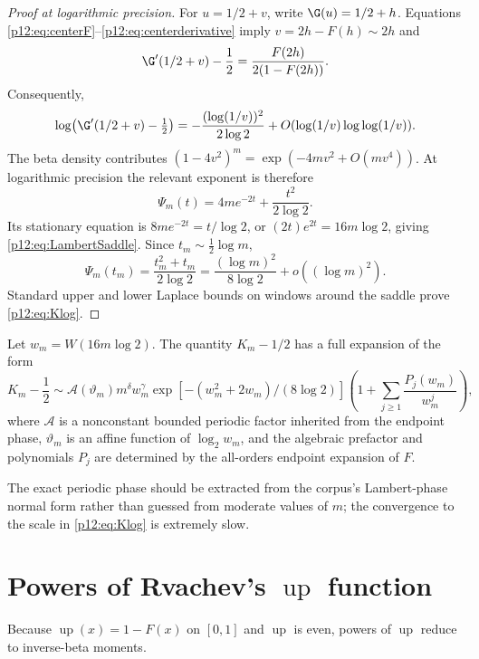 \documentclass[11pt,oneside]{article}
\theoremstyle{definition}
\theoremstyle{remark}
\newcommand{\F}{F}
\newcommand{\Up}{\operatorname{up}}
\newcommand{\1}{\mathbf 1}
\begin{document}
\begin{proof}[Proof at logarithmic precision]
For \(u=1/2+v\), write \(\G(u)=1/2+h\).  Equations
\eqref{p12:eq:centerF}--\eqref{p12:eq:centerderivative} imply \(v=2h-\F(h)\sim2h\) and
\[
 \G'(1/2+v)-\frac12
 =\frac{\F(2h)}{2(1-\F(2h))}.
\]
Consequently,
\begin{equation}\label{p12:eq:gprimeendpoint}
 \log\bigl(\G'(1/2+v)-\tfrac12\bigr)
 =-\frac{(\log(1/v))^2}{2\log2}
 +O(\log(1/v)\log\log(1/v)).
\end{equation}
The beta density contributes
\((1-4v^2)^m=\exp(-4mv^2+O(mv^4))\).  At logarithmic precision the relevant
exponent is therefore
\[
 \Psi_m(t)=4me^{-2t}+\frac{t^2}{2\log2}.
\]
Its stationary equation is
\(8me^{-2t}=t/\log2\), or
\((2t)e^{2t}=16m\log2\), giving \eqref{p12:eq:LambertSaddle}.  Since
\(t_m\sim\tfrac12\log m\),
\[
 \Psi_m(t_m)=\frac{t_m^2+t_m}{2\log2}
 =\frac{(\log m)^2}{8\log2}+o((\log m)^2).
\]
Standard upper and lower Laplace bounds on windows around the saddle prove
\eqref{p12:eq:Klog}.
\end{proof}

\begin{conjecture}\label{p12:conj:Kfull}
Let \(w_m=W(16m\log2)\).  The quantity \(K_m-1/2\) has a full expansion of the
form
\begin{equation}\label{p12:eq:Kfullconj}
 K_m-\frac12
 \sim \mathcal A(\vartheta_m)
 m^{\delta}w_m^{\gamma}\exp\!\left[-(w_m^2+2w_m)/(8\log2)\right]
 \left(1+\sum_{j\ge1}\frac{P_j(w_m)}{w_m^j}\right),
\end{equation}
where \(\mathcal A\) is a nonconstant bounded periodic factor inherited from the
endpoint phase, \(\vartheta_m\) is an affine function of
\(\log_2 w_m\), and the algebraic prefactor and polynomials \(P_j\) are determined by the
all-orders endpoint expansion of \(\F\).
\end{conjecture}

The exact periodic phase should be extracted from the corpus's Lambert-phase
normal form rather than guessed from moderate values of \(m\); the convergence
to the scale in \eqref{p12:eq:Klog} is extremely slow.

\section{Powers of Rvachev's \(\Up\) function}

Because \(\Up(x)=1-\F(x)\) on \([0,1]\) and \(\Up\) is even, powers of \(\Up\)
reduce to inverse-beta moments.
\end{document}
